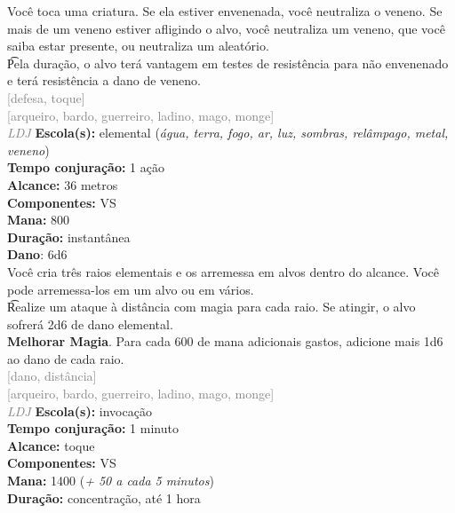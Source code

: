 \documentclass{RPG_Adventure}[2021/10/20]
\begin{document}
{\normalsize Você toca uma criatura. Se ela estiver envenenada, você neutraliza o veneno. Se mais de um veneno estiver afligindo o alvo, você neutraliza um veneno, que você saiba estar presente, ou neutraliza um aleatório.\\\t Pela duração, o alvo terá vantagem em testes de resistência para não envenenado e terá resistência a dano de veneno.\\}
{\scriptsize \textcolor{gray}{[defesa, toque]\\}}
{\scriptsize \textcolor{gray}{[arqueiro, bardo, guerreiro, ladino, mago, monge]\\}}
{\tiny \textcolor{gray}{\textit{LDJ}}}\jump{}
{\small \t \textbf{Escola(s):} elemental (\textit{água, terra, fogo, ar, luz, sombras, relâmpago, metal, veneno})\\\t \textbf{Tempo conjuração:} 1 ação\\\t \textbf{Alcance:} 36 metros\\\t \textbf{Componentes:} VS\\\t \textbf{Mana:} 800\\\t \textbf{Duração:} instantânea\\\t \textbf{Dano}: 6d6\\}
{\normalsize Você cria três raios elementais e os arremessa em alvos dentro do alcance. Você pode arremessa-los em um alvo ou em vários.\\\t Realize um ataque à distância com magia para cada raio. Se atingir, o alvo sofrerá 2d6 de dano elemental.\\\t \textbf{Melhorar Magia}. Para cada 600 de mana adicionais gastos, adicione mais 1d6 ao dano de cada raio.\\}
{\scriptsize \textcolor{gray}{[dano, distância]\\}}
{\scriptsize \textcolor{gray}{[arqueiro, bardo, guerreiro, ladino, mago, monge]\\}}
{\tiny \textcolor{gray}{\textit{LDJ}}}\jump{}
{\small \t \textbf{Escola(s):} invocação\\\t \textbf{Tempo conjuração:} 1 minuto\\\t \textbf{Alcance:} toque\\\t \textbf{Componentes:} VS\\\t \textbf{Mana:} 1400 (\textit{+ 50 a cada 5 minutos})\\\t \textbf{Duração:} concentração, até 1 hora\\}
\end{document}
